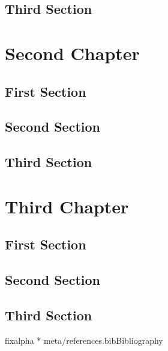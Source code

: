 \documentclass{iasthesis}
\newcommand{\filterminitoc}[1]{#1}
\newcommand{\minitocsection}{\begingroup\renewcommand{\filterminitoc}[1]{}\minitoc\endgroup}
\begin{document}
	\section{Third Section}
	\kant
	
	\chapter{Second Chapter}
	\minitocsection 
	\kant
	\section{First Section}
	\kant
	\section{Second Section}
	\kant
	\section{Third Section}
	\kant
	
	\chapter{Third Chapter}
	\minitocsection 
	\kant
	\section{First Section}
	\kant
	\section{Second Section}
	\kant
	\section{Third Section}
	\kant
	
	{fixalpha}
	\setlength{\bibitemsep}{.25\baselineskip plus .05\baselineskip minus .05\baselineskip}
	\nocite{refs}{*}
	{meta/references.bib}{Bibliography}
	
\end{document}
